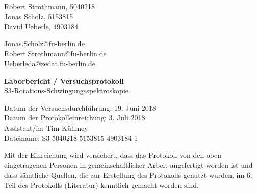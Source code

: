 
\thispagestyle{empty}

\begin{flushleft}
Robert Strothmann, 5040218\\ 
Jonas Scholz, 5153815\\ 
David Ueberle, 4903184\\ 
\end{flushleft}
\vspace*{0.3cm}
Jonas.Scholz@fu-berlin.de\\
Robert.Strothmann@fu-berlin.de\\
Ueberleda@zedat.fu-berlin.de\\
\begin{center}
	\vspace*{1cm}
	\Large
	{ \bfseries Laborbericht / Versuchsprotokoll}\\
	\vspace*{1cm}
	{S3-Rotations-Schwingungsspektroskopie}\\
\end{center}
	\vspace*{1cm}
	{Datum der Versuchsdurchführung: 19. Juni 2018}\\
	{Datum der Protokolleinreichung:  3. Juli 2018}\\
	{Assistent/in: Tim Küllmey}\\
	{Dateiname: S3-5040218-5153815-4903184-1}	
	\vfill
\begin{flushleft}
Mit der Einreichung wird versichert, dass das Protokoll von den oben eingetragenen Personen in gemeinschaftlicher Arbeit angefertigt worden ist und dass sämtliche Quellen, die zur Erstellung des Protokolls genutzt wurden, im 6. Teil des Protokolls (Literatur) kenntlich gemacht worden sind.
\end{flushleft}

\normalsize
\newpage
%